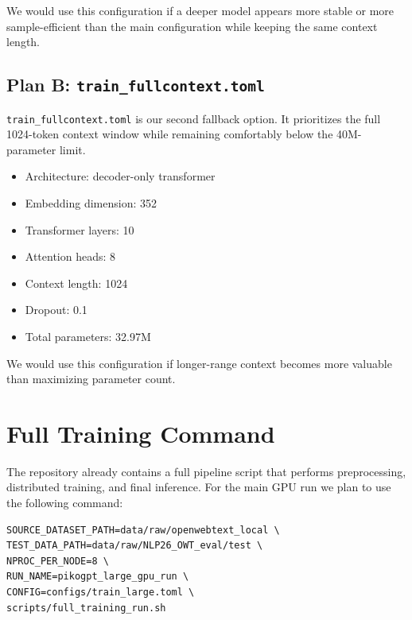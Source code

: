 \documentclass[11pt]{article}
\begin{document}
We would use this configuration if a deeper model appears more stable or more sample-efficient than the main configuration while keeping the same context length.

\subsection*{Plan B: \texttt{train\_fullcontext.toml}}
\texttt{train\_fullcontext.toml} is our second fallback option. It prioritizes the full 1024-token context window while remaining comfortably below the 40M-parameter limit.

\begin{itemize}[leftmargin=1.5em]
  \item Architecture: decoder-only transformer
  \item Embedding dimension: 352
  \item Transformer layers: 10
  \item Attention heads: 8
  \item Context length: 1024
  \item Dropout: 0.1
  \item Total parameters: 32.97M
\end{itemize}

We would use this configuration if longer-range context becomes more valuable than maximizing parameter count.

\section*{Full Training Command}
The repository already contains a full pipeline script that performs preprocessing, distributed training, and final inference. For the main GPU run we plan to use the following command:

\begin{verbatim}
SOURCE_DATASET_PATH=data/raw/openwebtext_local \
TEST_DATA_PATH=data/raw/NLP26_OWT_eval/test \
NPROC_PER_NODE=8 \
RUN_NAME=pikogpt_large_gpu_run \
CONFIG=configs/train_large.toml \
scripts/full_training_run.sh
\end{verbatim}
\end{document}
